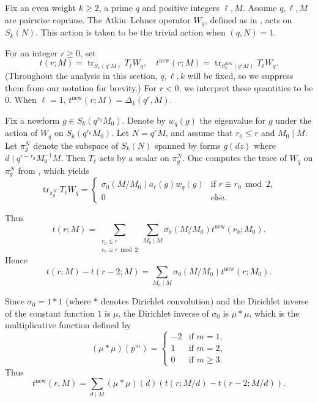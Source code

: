 \documentclass[11pt]{amsart}
\newcommand{\new}{\mathrm{new}}
\renewcommand{\mod}{\bmod}
\DeclareMathOperator{\tr}{tr}
\numberwithin{lem}{section}
\theoremstyle{remark}
\theoremstyle{definition}
\numberwithin{equation}{section}
\begin{document}

Fix an even weight $k \ge 2$,  a prime $q$ and positive integers 
$\ell, M$.  Assume $q, \ell, M$ are pairwise coprime.  
The Atkin--Lehner operator $W_q$, defined as in \cite{AL},
acts on $S_k(N)$.  This action is taken to be the trivial action when $(q,N) = 1$.

For an integer $r \ge 0$, set
\[ t(r; M) = \tr_{S_k(q^r M)} T_\ell W_q, \quad
 t^\new(r; M)  =  \tr_{S_k^\new(q^r M)} T_\ell W_q. \]
 (Throughout the analysis in this section, $q, \ell, k$ will be fixed, so we suppress them from our notation for brevity.)
 For $r < 0$, we interpret these quantities to be $0$.  When $\ell = 1$,
 $t^\new(r;M) = \Delta_k(q^r, M)$.

Fix a newform $g \in S_k(q^{r_0}M_0)$.  Denote by $w_q(g)$ the eigenvalue for $g$ under the action of $W_q$ on $S_k(q^{r_0}M_0)$.
Let $N = q^r M$, and assume that $r_0 \le r$ and
$M_0 \mid M$.  Let $\pi_g^N$ denote the subspace of $S_k(N)$ spanned by forms $g(dz)$ where $d \mid q^{r-r_0} M_0^{-1} M$.  Then $T_\ell$ acts by a scalar on $\pi_g^N$.
One computes the trace of $W_q$ on $\pi_g^N$ from \cite[(5.1)--(5.2)]{AL}, which yields
\[ \tr_{\pi_g^N} T_\ell W_q = 
\begin{cases}
\sigma_0(M/M_0) a_\ell(g) w_q(g) &\text{if } r \equiv r_0 \mod 2, \\
0 & \text{else}.
\end{cases} \]

Thus
\[ t(r; M) = \sum_{\substack{r_0 \le r \\
r_0 \equiv r \mod 2}} \sum_{M_0 \mid M} \sigma_0(M/M_0) t^\new(r_0; M_0). \]
Hence
\[  t(r; M) - t(r-2; M) =  \sum_{M_0 \mid M} \sigma_0(M/M_0) t^\new(r; M_0). \]

Since $\sigma_0 = 1 * 1$ (where $*$ denotes Dirichlet convolution) and the Dirichlet inverse of the constant function $1$ is $\mu$, the Dirichlet inverse of $\sigma_0$ is $\mu * \mu$, which is the multiplicative function defined by
\[ (\mu * \mu)(p^m) = \begin{cases}
-2 & \text{if }m = 1, \\
1 & \text{if }m = 2, \\
0 & \text{if }m \ge 3.
\end{cases} \]
Thus 
\[ t^\new(r,M) = \sum_{d \mid M} (\mu * \mu) (d) \left( t(r; M/d) - t(r-2; M/d) \right). \]
\end{document}
